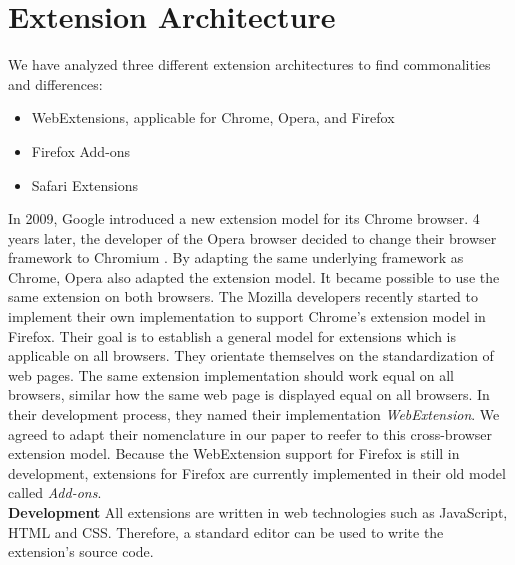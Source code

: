
\section{Extension Architecture}

	We have analyzed three different extension architectures to find commonalities and differences: 
	\begin{itemize}
		\itemsep-0.5em
		\item WebExtensions, applicable for Chrome, Opera, and Firefox
		\item Firefox Add-ons
		\item Safari Extensions
	\end{itemize}
	
	In 2009, Google introduced a new extension model for its Chrome browser. 4 years later, the developer of the Opera browser decided to change their browser framework to Chromium \cite{operaBlogSwitchToChromium}. By adapting the same underlying framework as Chrome, Opera also adapted the extension model. It became possible to use the same extension on both browsers. The Mozilla developers recently started to implement their own implementation to support Chrome's extension model in Firefox. Their goal is to establish a general model for extensions which is applicable on all browsers. They orientate themselves on the standardization of web pages. The same extension implementation should work equal on all browsers, similar how the same web page is displayed equal on all browsers. %
	In their development process, they named their implementation \textit{WebExtension}. We agreed to adapt their nomenclature in our paper to reefer to this cross-browser extension model. Because the WebExtension support for Firefox is still in development, extensions for Firefox are currently implemented in their old model called \textit{Add-ons}. \\
	
	\textbf{Development} All extensions are written in web technologies such as JavaScript, HTML and CSS. Therefore, a standard editor can be used to write the extension's source code. 
	

